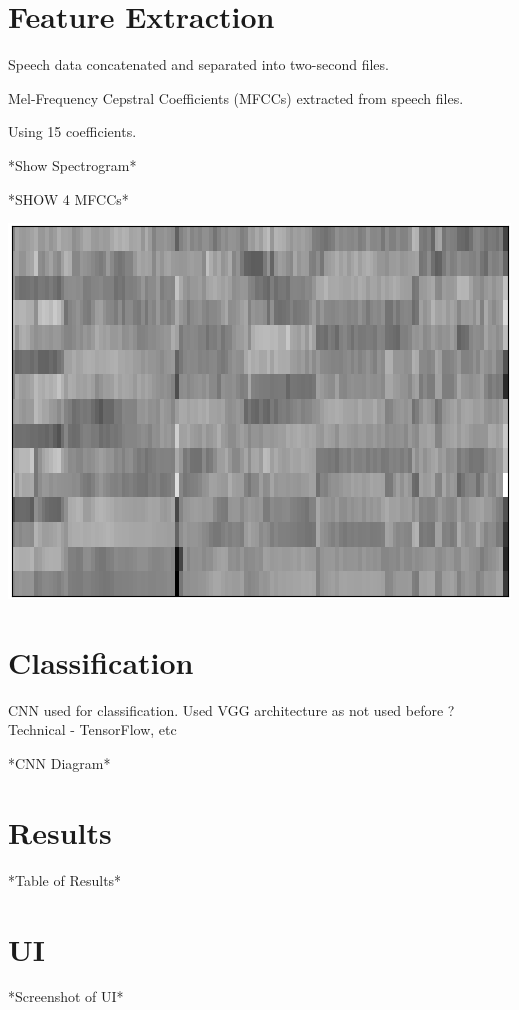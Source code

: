 \documentclass[a1,landscape]{a0poster}
\begin{document}
\begin{multicols}{4}
\section*{Feature Extraction}
Speech data concatenated and separated into two-second files.

Mel-Frequency Cepstral Coefficients (MFCCs) extracted from speech files.

Using 15 coefficients.

*Show Spectrogram*

*SHOW 4 MFCCs*
\begin{center}\vspace{1cm}
	\includegraphics[width=0.8\linewidth]{mfcc}
\end{center}\vspace{1cm}

\section*{Classification}
CNN used for classification. Used VGG architecture as not used before
? Technical - TensorFlow, etc

*CNN Diagram*
\section*{Results}
*Table of Results*

\section*{UI}
*Screenshot of UI*





\end{multicols}
\end{document}
